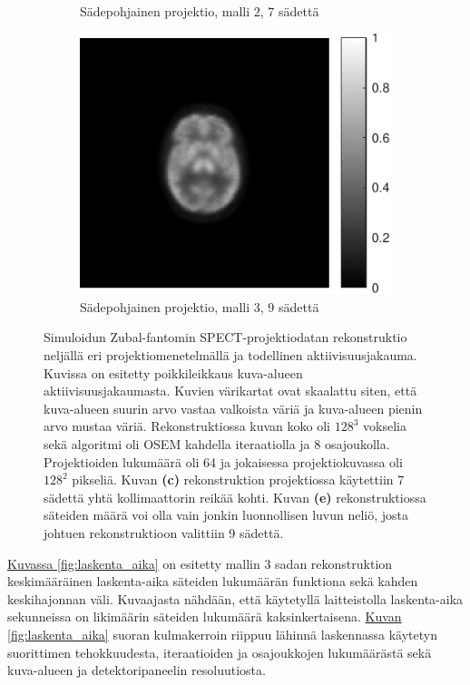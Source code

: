 \begin{figure}[H]
\begin{subfigure}[b]{.25\textwidth}
        \caption{Sädepohjainen projektio, malli 2, 7 sädettä}
    \end{subfigure}%
    \hspace{.075\textwidth}%
    \begin{subfigure}[b]{.25\textwidth}
        \includegraphics[width=\linewidth]{kuvat/cbf_rekonstruktio_proj1_malli3_nRay9.pdf}
        \caption{Sädepohjainen projektio, malli 3, 9 sädettä}
    \end{subfigure}
    \caption{Simuloidun Zubal-fantomin SPECT-projektiodatan rekonstruktio neljällä eri projektiomenetelmällä ja todellinen aktiivisuusjakauma. Kuvissa on esitetty poikkileikkaus kuva-alueen aktiivisuusjakaumasta. Kuvien värikartat ovat skaalattu siten, että kuva-alueen suurin arvo vastaa valkoista väriä ja kuva-alueen pienin arvo mustaa väriä. Rekonstruktiossa kuvan koko oli $128^3$ vokselia sekä algoritmi oli OSEM kahdella iteraatiolla ja 8 osajoukolla. Projektioiden lukumäärä oli 64 ja jokaisessa projektiokuvassa oli $128^2$ pikseliä. Kuvan \textbf{(c)} rekonstruktion projektiossa käytettiin 7 sädettä yhtä kollimaattorin reikää kohti. Kuvan \textbf{(e)} rekonstruktiossa säteiden määrä voi olla vain jonkin luonnollisen luvun neliö, josta johtuen rekonstruktioon valittiin 9 sädettä.}
    \label{fig:cbf-rekonstruktiot}
\end{figure}

\hyperref[fig:laskenta_aika]{Kuvassa \ref*{fig:laskenta_aika}} on esitetty mallin 3 sadan rekonstruktion keskimääräinen laskenta-aika säteiden lukumäärän funktiona sekä kahden keskihajonnan väli. Kuvaajasta nähdään, että käytetyllä laitteistolla laskenta-aika sekunneissa on likimäärin säteiden lukumäärä kaksinkertaisena. \hyperref[fig:laskenta_aika]{Kuvan \ref*{fig:laskenta_aika}} suoran kulmakerroin riippuu lähinnä laskennassa käytetyn suorittimen tehokkuudesta, iteraatioiden ja osajoukkojen lukumäärästä sekä kuva-alueen ja detektoripaneelin resoluutiosta.

